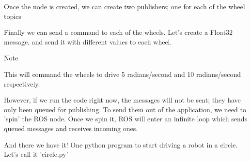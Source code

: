 Once the node is created, we can create two publishers; one for each of
the wheel topics

\begin{Shaded}
\begin{Highlighting}[]
\OperatorTok{=}\NormalTok{)}
\OperatorTok{=}\NormalTok{)}
\end{Highlighting}
\end{Shaded}

Finally we can send a command to each of the wheels. Let's create a
Float32 message, and send it with different values to each wheel.

\begin{Shaded}
\begin{Highlighting}[]
\OperatorTok{=}

\OperatorTok{=} 

\OperatorTok{=} 
\end{Highlighting}
\end{Shaded}

Note

This will command the wheels to drive 5 radians/second and 10
radians/second respectively.

However, if we run the code right now, the messages will not be sent;
they have only been queued for publishing. To send them out of the
application, we need to 'spin' the ROS node. Once we spin it, ROS will
enter an infinite loop which sends queued messages and receives incoming
ones.

\begin{Shaded}
\begin{Highlighting}[]

\end{Highlighting}
\end{Shaded}

And there we have it! One python program to start driving a robot in a
circle. Let's call it 'circle.py'

